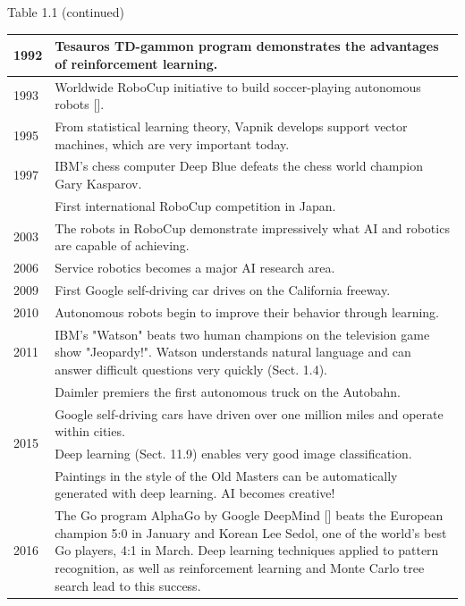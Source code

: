 \documentclass[10pt]{book}
\begin{document}
Table 1.1 (continued)
\begin{table}[htbp]
\centering
\begin{tabular}{|l|l|}
\hline
1992 & Tesauros TD-gammon program demonstrates the advantages of reinforcement learning. \\
\hline
1993 & Worldwide RoboCup initiative to build soccer-playing autonomous robots [\cite{robocupsite}]. \\
\hline
1995 & From statistical learning theory, Vapnik develops support vector machines, which are very important today. \\
\hline
1997 & IBM's chess computer Deep Blue defeats the chess world champion Gary Kasparov. \\
\hline
 & First international RoboCup competition in Japan. \\
\hline
2003 & The robots in RoboCup demonstrate impressively what AI and robotics are capable of achieving. \\
\hline
2006 & Service robotics becomes a major AI research area. \\
\hline
2009 & First Google self-driving car drives on the California freeway. \\
\hline
2010 & Autonomous robots begin to improve their behavior through learning. \\
\hline
2011 & IBM's "Watson" beats two human champions on the television game show "Jeopardy!". Watson understands natural language and can answer difficult questions very quickly (Sect. 1.4). \\
\hline
\multirow[t]{4}{*}{2015} & Daimler premiers the first autonomous truck on the Autobahn. \\
\hline
 & Google self-driving cars have driven over one million miles and operate within cities. \\
\hline
 & Deep learning (Sect. 11.9) enables very good image classification. \\
\hline
 & Paintings in the style of the Old Masters can be automatically generated with deep learning. AI becomes creative! \\
\hline
2016 & The Go program AlphaGo by Google DeepMind [\cite{silver2016alphago}] beats the European champion 5:0 in January and Korean Lee Sedol, one of the world's best Go players, 4:1 in March. Deep learning techniques applied to pattern recognition, as well as reinforcement learning and Monte Carlo tree search lead to this success. \\
\hline
\end{tabular}
\end{table}
\end{document}
